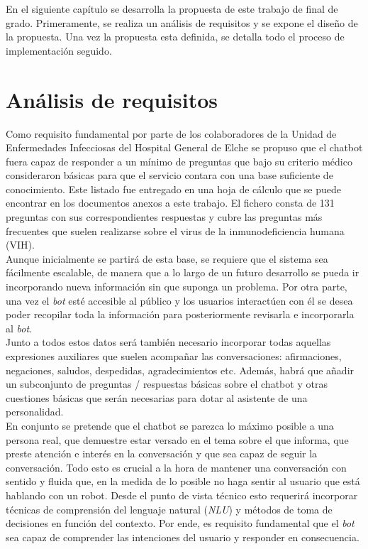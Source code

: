 En el siguiente capítulo se desarrolla la propuesta de este trabajo de final de grado. Primeramente, se realiza un análisis de requisitos y se expone el diseño de la propuesta. Una vez la propuesta esta definida, se detalla todo el proceso de implementación seguido.

\section{Análisis de requisitos}
Como requisito fundamental por parte de los colaboradores de la Unidad de Enfermedades Infecciosas del Hospital General de Elche se propuso que el chatbot fuera capaz de responder a un mínimo de preguntas que bajo su criterio médico consideraron básicas para que el servicio contara con una base suficiente de conocimiento. Este listado fue entregado en una hoja de cálculo que se puede encontrar en los documentos anexos a este trabajo. El fichero consta de 131 preguntas con sus correspondientes respuestas y cubre las preguntas más frecuentes que suelen realizarse sobre el virus de la inmunodeficiencia humana (VIH). \\

Aunque inicialmente se partirá de esta base, se requiere que el sistema sea fácilmente escalable, de manera que a lo largo de un futuro desarrollo se pueda ir incorporando nueva información sin que suponga un problema. Por otra parte, una vez el \textit{bot} esté accesible al público y los usuarios interactúen con él se desea poder recopilar toda la información para posteriormente revisarla e incorporarla al \textit{bot}.\\

Junto a todos estos datos será también necesario incorporar todas aquellas expresiones auxiliares que suelen acompañar las conversaciones: afirmaciones, negaciones, saludos, despedidas, agradecimientos etc. Además, habrá que añadir un subconjunto de preguntas / respuestas básicas sobre el chatbot y otras cuestiones básicas que serán necesarias para dotar al asistente de una personalidad.\\

En conjunto se pretende que el chatbot se parezca lo máximo posible a una persona real, que demuestre estar versado en el tema sobre el que informa, que preste atención e interés en la conversación y que sea capaz de seguir la conversación. Todo esto es crucial a la hora de mantener una conversación con sentido y fluida que, en la medida de lo posible no haga sentir al usuario que está hablando con un robot. Desde el punto de vista técnico esto requerirá incorporar técnicas de comprensión del lenguaje natural (\textit{NLU}) y métodos de toma de decisiones en función del contexto. Por ende, es requisito fundamental que el \textit{bot} sea capaz de comprender las intenciones del usuario y responder en consecuencia.\\

